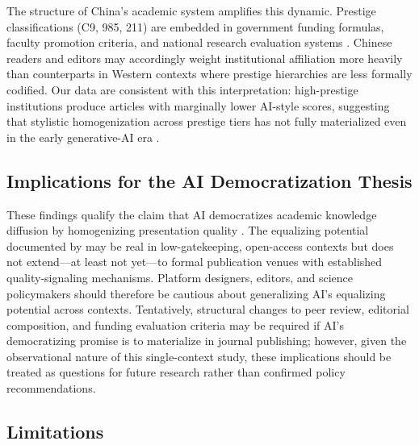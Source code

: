 \documentclass[12pt,a4paper]{article}
\begin{document}
The structure of China's academic system amplifies this dynamic.
Prestige classifications (C9, 985, 211) are embedded in government
funding formulas, faculty promotion criteria, and national research
evaluation systems \citep{DiMaggio1983}.
Chinese readers and editors may accordingly weight institutional
affiliation more heavily than counterparts in Western contexts where
prestige hierarchies are less formally codified.
Our data are consistent with this interpretation: high-prestige
institutions produce articles with marginally lower AI-style scores,
suggesting that stylistic homogenization across prestige tiers has not
fully materialized even in the early generative-AI era
\citep{VanNoorden2023}.

\subsection{Implications for the AI Democratization Thesis}

These findings qualify the claim that AI democratizes academic
knowledge diffusion by homogenizing presentation quality
\citep{Huang2021,Liang2024}.
The equalizing potential documented by \citet{JoLi2026} may be
real in low-gatekeeping, open-access contexts but does not extend---at
least not yet---to formal publication venues with established
quality-signaling mechanisms.
Platform designers, editors, and science policymakers should therefore
be cautious about generalizing AI's equalizing potential across
contexts.
Tentatively, structural changes to peer review, editorial composition,
and funding evaluation criteria may be required if AI's democratizing
promise is to materialize in journal publishing; however, given the
observational nature of this single-context study, these implications
should be treated as questions for future research rather than
confirmed policy recommendations.

\subsection{Limitations}
\end{document}
